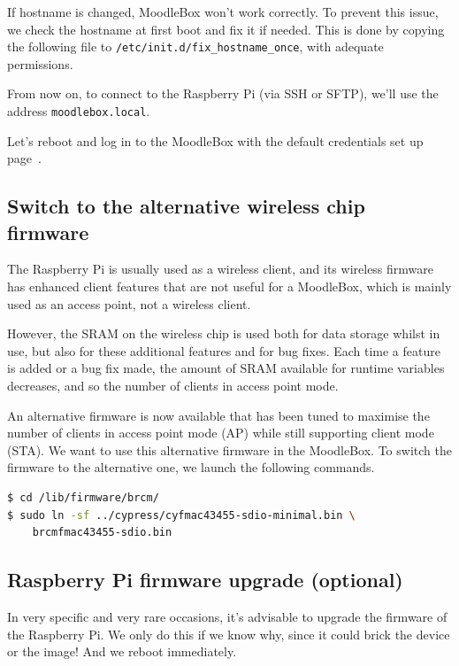 \documentclass[12pt]{article}
\begin{document}
If hostname is changed, MoodleBox won't work correctly.
To prevent this issue, we check the hostname at first boot and fix it if needed.
This is done by copying the following file to \lstinline{/etc/init.d/fix_hostname_once}, with adequate permissions.



From now on, to connect to the Raspberry Pi (via SSH or SFTP), we'll use the address \lstinline{moodlebox.local}.

Let's reboot and log in to the MoodleBox with the default credentials set up page~\pageref{ssec-new-account}.

\subsection{Switch to the alternative wireless chip firmware}

The Raspberry Pi is usually used as a wireless client, and its wireless firmware has enhanced client features that are not useful for a MoodleBox, which is mainly used as an access point, not a wireless client.

However, the SRAM on the wireless chip is used both for data storage whilst in use, but also for these additional features and for bug fixes.
Each time a feature is added or a bug fix made, the amount of SRAM available for runtime variables decreases, and so the number of clients in access point mode.

An alternative firmware is now available that has been tuned to maximise the number of clients in access point mode (AP) while still supporting client mode (STA).
We want to use this alternative firmware in the MoodleBox.
To switch the firmware to the alternative one, we launch the following commands.

\begin{lstlisting}[language=bash]
$ cd /lib/firmware/brcm/
$ sudo ln -sf ../cypress/cyfmac43455-sdio-minimal.bin \
    brcmfmac43455-sdio.bin
\end{lstlisting}

\subsection{Raspberry Pi firmware upgrade  (optional)}

In very specific and very rare occasions, it's advisable to upgrade the firmware of the Raspberry Pi.
We only do this if we know why, since it could brick the device or the image!
And we reboot immediately.
\end{document}
